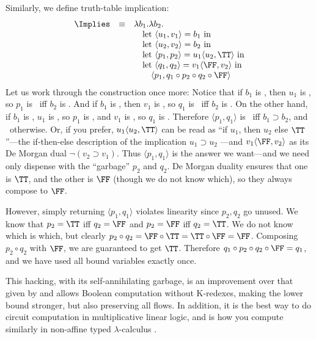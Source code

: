 Similarly, we define truth-table implication:
\begin{displaymath}
\begin{array}{rcl}
\Implies & \equiv & \lambda b_1.\lambda b_2.\\
\ & \ & \quad\mbox{let }\langle u_1,v_1\rangle = b_1\mbox{ in}\\
\ & \ & \quad\mbox{let }\langle u_2,v_2\rangle = b_2\mbox{ in}\\
\ & \ & \quad\mbox{let }\langle p_1,p_2\rangle = u_1\langle u_2, \TT\rangle \mbox{ in}\\
\ & \ & \quad\mbox{let }\langle q_1,q_2\rangle = v_1\langle \FF, v_2\rangle \mbox{ in}\\
\ & \ & \qquad\langle p_1, q_1 \circ p_2 \circ q_2 \circ \FF \rangle
\end{array}
\end{displaymath}
Let us work through the construction once more: Notice that if $b_1$
is \True, then $u_1$ is \TT, so $p_1$ is \TT\ iff $b_2$ is \True.  And
if $b_1$ is \True, then $v_1$ is \FF, so $q_1$ is \FF\ iff $b_2$ is
\False.  On the other hand, if $b_1$ is \False, $u_1$ is \FF, so $p_1$
is \TT, and $v_1$ is \TT, so $q_1$ is \FF.  Therefore $\langle
p_1,q_1\rangle$ is \True\ iff $b_1 \supset b_2$, and \False\
otherwise. Or, if you prefer, $u_1 \langle u_2,\TT\rangle$ can be read
as ``if $u_1$, then $u_2$ else $\TT$''---the if-then-else description
of the implication $u_1\supset u_2$ ---and $v_1 \langle \FF,
v_2\rangle$ as its De Morgan dual $\neg(v_2\supset v_1)$.  Thus
$\langle p_1,q_1\rangle$ is the answer we want---and we need only
dispense with the ``garbage'' $p_2$ and $q_2$.  De Morgan duality
ensures that one is $\TT$, and the other is $\FF$ (though we do not
know which), so they always compose to $\FF$.

However, simply returning $\langle p_1,q_1\rangle$ violates linearity since
$p_2,q_2$ go unused.  We know that $p_2 = \TT$ iff $q_2 = \FF$ and
$p_2 = \FF$ iff $q_2 = \TT$.  We do not know which is which, but
clearly $p_2 \circ q_2 = \FF\circ\TT = \TT\circ\FF = \FF$.  Composing $p_2\circ
q_2$ with $\FF$, we are guaranteed to get $\TT$.  Therefore $q_1
\circ p_2 \circ q_2 \circ \FF = q_1$, and we have used all bound
variables exactly once.

This hacking, with its self-annihilating garbage, is an improvement
over that given by \citet{mairson-jfp04} and allows Boolean computation
without K-redexes, making the lower bound stronger, but also
preserving all flows.  In addition, it is the best way to do circuit
computation in multiplicative linear logic, and is how you compute
similarly in non-affine typed $\lambda$-calculus \cite{mairson-geocal06}.

